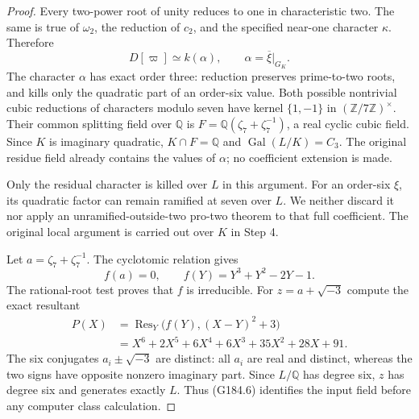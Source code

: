 \begin{proof}
Every two-power root of unity reduces to one in characteristic two.
The same is true of $\omega_2$, the reduction of $c_2$, and the
specified near-one character $\kappa$.  Therefore
\[
                         D[\varpi]\simeq k(\alpha),
                         \qquad\alpha=\overline\xi|_{G_K}.
 \tag{G184.5}
\]
The character $\alpha$ has exact order three: reduction preserves
prime-to-two roots, and kills only the quadratic part of an
order-six value.  Both possible nontrivial cubic reductions of
characters modulo seven have kernel $\{1,-1\}$ in
$(\mathbb Z/7\mathbb Z)^\times$.
Their common splitting field over $\mathbb Q$ is
$F=\mathbb Q(\zeta_7+\zeta_7^{-1})$, a real cyclic cubic field.
Since $K$ is imaginary quadratic, $K\cap F=\mathbb Q$ and
$\operatorname{Gal}(L/K)=C_3$.
The original residue field already contains the values of $\alpha$;
no coefficient extension is made.

Only the residual character is killed over $L$ in this argument.
For an order-six $\xi$, its quadratic factor can remain ramified at
seven over $L$.  We neither discard it nor apply an
unramified-outside-two pro-two theorem to that full coefficient.
The original local argument is carried out over $K$ in Step 4.

Let $a=\zeta_7+\zeta_7^{-1}$.  The cyclotomic relation gives
\[
                         f(a)=0,\qquad f(Y)=Y^3+Y^2-2Y-1.
\]
The rational-root test proves that $f$ is irreducible.
For $z=a+\sqrt{-3}$ compute the exact resultant
\[
 \begin{split}
 P(X)&=\operatorname{Res}_Y\bigl(f(Y),(X-Y)^2+3\bigr)\\
 &=X^6+2X^5+6X^4+6X^3+35X^2+28X+91.
 \end{split}                                                 \tag{G184.6}
\]
The six conjugates $a_i\pm\sqrt{-3}$ are distinct: all $a_i$ are
real and distinct, whereas the two signs have opposite nonzero
imaginary part.  Since $L/\mathbb Q$ has degree six, $z$ has degree
six and generates exactly $L$.  Thus (G184.6) identifies the input
field before any computer class calculation.


\end{proof}
